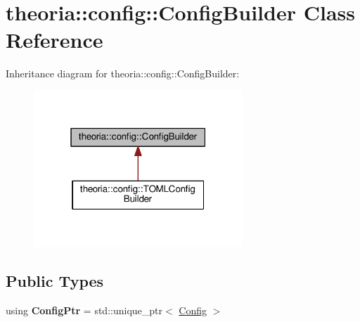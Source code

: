 \hypertarget{classtheoria_1_1config_1_1ConfigBuilder}{\section{theoria\+:\+:config\+:\+:Config\+Builder Class Reference}
\label{classtheoria_1_1config_1_1ConfigBuilder}
}


Inheritance diagram for theoria\+:\+:config\+:\+:Config\+Builder\+:
\nopagebreak
\begin{figure}[H]
\begin{center}
\leavevmode
\includegraphics[width=223pt]{classtheoria_1_1config_1_1ConfigBuilder__inherit__graph}
\end{center}
\end{figure}
\subsection*{Public Types}
\begin{DoxyCompactItemize}
\item 
\hypertarget{classtheoria_1_1config_1_1ConfigBuilder_a31d4cfc983e8ad468c483822731d790f}{using {\bfseries Config\+Ptr} = std\+::unique\+\_\+ptr$<$ \hyperlink{classtheoria_1_1config_1_1Config}{Config} $>$}\label{classtheoria_1_1config_1_1ConfigBuilder_a31d4cfc983e8ad468c483822731d790f}

\end{DoxyCompactItemize}
